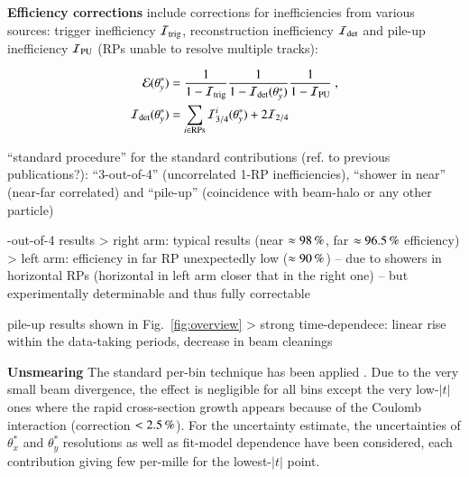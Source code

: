 
{\bf Efficiency corrections} include corrections for inefficiencies from various sources: trigger inefficiency ${\cal I}_{\rm trig}$, reconstruction inefficiency ${\cal I}_{\rm det}$ and pile-up inefficiency ${\cal I}_{\rm PU}$ (RPs unable to resolve multiple tracks):

\begin{equation}
\label{efficiency}
	\begin{aligned}
		{\cal E}(\theta_y^*) &= {1\over 1 - {\cal I}_{\rm trig}} {1\over 1 - {\cal I}_{\rm det}(\theta_y^*)} {1\over 1 - {\cal I}_{\rm PU}}\ ,\\
		{\cal I}_{\rm det}(\theta_y^*) &= \sum\limits_{i\in \rm RPs} {\cal I}^i_{3/4}(\theta_y^*) + 2 {\cal I}_{2/4}\\
	\end{aligned}
\end{equation}

\> ``standard procedure'' for the standard contributions (ref. to previous publications?): ``3-out-of-4'' (uncorrelated 1-RP inefficiencies), ``shower in near'' (near-far correlated) and ``pile-up'' (coincidence with beam-halo or any other particle)

-out-of-4 results
\>> right arm: typical results (near $\approx 98\,{\rm \%}$, far $\approx 96.5\,{\rm \%}$ efficiency)
\>> left arm: efficiency in far RP unexpectedly low ($\approx 90\,{\rm \%}$) -- due to showers in horizontal RPs (horizontal in left arm closer that in the right one) -- but experimentally determinable and thus fully correctable

\> pile-up results shown in Fig.~\ref{fig:overview}
\>> strong time-dependece: linear rise within the data-taking periods, decrease in beam cleanings



{\bf Unsmearing} The standard per-bin technique has been applied \cite{8tev-90m}. Due to the very small beam divergence, the effect is negligible for all bins except the very low-$|t|$ ones where the rapid cross-section growth appears because of the Coulomb interaction (correction $< 2.5\,{\rm \%}$). For the uncertainty estimate, the uncertainties of $\theta_x^*$ and $\theta_y^*$ resolutions as well as fit-model dependence have been considered, each contribution giving few per-mille for the lowest-$|t|$ point.

